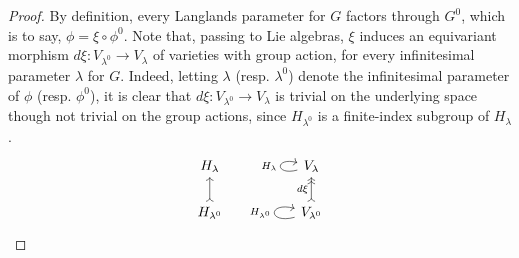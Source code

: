 \documentclass[11pt,letterpaper]{amsart}
\numberwithin{equation}{section}
\begin{document}
\begin{proof} 
By definition, every Langlands parameter for $G$ factors through $G^0$, which is to say, $\phi = \xi\circ \phi^0$. 
Note that, passing to Lie algebras, $\xi$ induces an equivariant morphism $d\xi : V_{\lambda^0} \to V_{\lambda}$ of varieties with group action, for every  infinitesimal parameter $\lambda$ for $G$. 
Indeed, letting $\lambda$ (resp. $\lambda^0$) denote the infinitesimal parameter of $\phi$ (resp. $\phi^0$), it is clear that $d\xi : V_{\lambda^0}\to V_{\lambda}$ is trivial on the underlying space though not trivial on the group actions, since $H_{\lambda^0}$ is a finite-index subgroup of $H_{\lambda}$.
\[
\begin{tikzcd}
    H_{\lambda} &&  V_{\lambda} \ar[loop left]{r}{ H_{\lambda} } 
     \\
    \arrow[>->]{u}
    H_{\lambda^0} 
    && 
    V_{\lambda^0} \arrow[loop left]{r}{H_{\lambda^0}} \arrow[>->>]{u} {d\xi}
\end{tikzcd}
\]


\end{proof}
\end{document}
